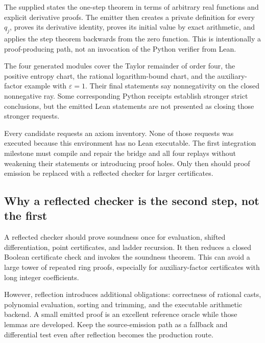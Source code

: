 The supplied  states the one-step theorem in terms of
arbitrary real functions and explicit derivative proofs. The emitter then
creates a private definition for every $q_j$, proves its derivative identity,
proves its initial value by exact arithmetic, and applies the step theorem
backwards from the zero function. This is intentionally a proof-producing
path, not an invocation of the Python verifier from Lean.

The four generated modules cover the Taylor remainder of order four, the
positive entropy chart, the rational logarithm-bound chart, and the
auxiliary-factor example with $\varepsilon=1$. Their final statements
say nonnegativity on the closed nonnegative ray. Some corresponding Python
receipts establish stronger strict conclusions, but the emitted Lean statements
are not presented as closing those stronger requests.

Every candidate requests an axiom inventory. None of those requests was
executed because this environment has no Lean executable. The first integration
milestone must compile and repair the bridge and all four replays without
weakening their statements or introducing proof holes. Only then should proof
emission be replaced with a reflected checker for larger certificates.

\subsection{Why a reflected checker is the second step, not the first}

A reflected checker should prove soundness once for evaluation, shifted
 differentiation, point certificates, and ladder recursion. It then reduces a
closed Boolean certificate check and invokes the soundness theorem. This can
avoid a large tower of repeated ring proofs, especially for auxiliary-factor
certificates with long integer coefficients.

However, reflection introduces additional obligations: correctness of rational
casts, polynomial evaluation, sorting and trimming, and the executable
arithmetic backend. A small emitted proof is an excellent reference oracle
while those lemmas are developed. Keep the source-emission path as a fallback
and differential test even after reflection becomes the production route.

